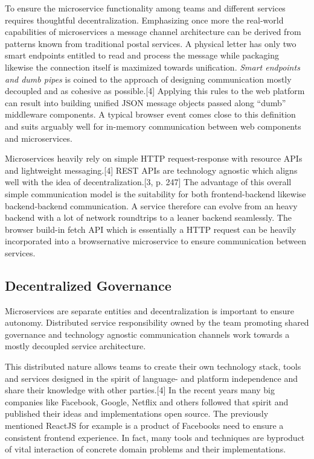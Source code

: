 \documentclass[]{article}
\begin{document}
To ensure the microservice functionality among teams and different
services requires thoughtful decentralization. Emphasizing once more the
real-world capabilities of microservices a message channel architecture
can be derived from patterns known from traditional postal services. A
physical letter has only two smart endpoints entitled to read and
process the message while packaging likewise the connection itself is
maximized towards unification. \emph{Smart endpoints and dumb pipes} is
coined to the approach of designing communication mostly decoupled and
as cohesive as possible.{[}4{]} Applying this rules to the web platform
can result into building unified JSON message objects passed along
``dumb'' middleware components. A typical browser event comes close to
this definition and suits arguably well for in-memory communication
between web components and microservices.

Microservices heavily rely on simple HTTP request-response with resource
APIs and lightweight messaging.{[}4{]} REST APIs are technology agnostic
which aligns well with the idea of decentralization.{[}3, p. 247{]} The
advantage of this overall simple communication model is the suitability
for both frontend-backend likewise backend-backend communication. A
service therefore can evolve from an heavy backend with a lot of network
roundtrips to a leaner backend seamlessly. The browser build-in fetch
API which is essentially a HTTP request can be heavily incorporated into
a browsernative microservice to ensure communication between services.

\subsection{Decentralized Governance}\label{decentralized-governance}

Microservices are separate entities and decentralization is important to
ensure autonomy. Distributed service responsibility owned by the team
promoting shared governance and technology agnostic communication
channels work towards a mostly decoupled service architecture.

This distributed nature allows teams to create their own technology
stack, tools and services designed in the spirit of language- and
platform independence and share their knowledge with other
parties.{[}4{]} In the recent years many big companies like Facebook,
Google, Netflix and others followed that spirit and published their
ideas and implementations open source. The previously mentioned ReactJS
for example is a product of Facebooks need to ensure a consistent
frontend experience. In fact, many tools and techniques are byproduct of
vital interaction of concrete domain problems and their implementations.
\end{document}
